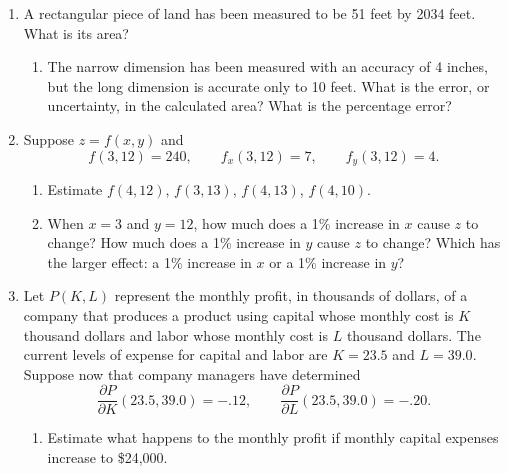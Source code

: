 \begin{enumerate}
\begin{enumerate}
  \item Write the full microscope equation for $G(u, v)$ at $(u, v) = (1,
2)$.

  \item Use the full microscope equation to approximate $G(.8,2.1)$.  How
close is your approximation to the true value of $G(.8,2.1)$?



\end{enumerate}
\item A rectangular piece of land has been measured to be 51 feet by
2034 feet.  What is its area?

  \begin{enumerate}
  \item The narrow dimension has been measured with an accuracy of 4
inches, but the long dimension is accurate only to 10 feet.  What is
the error, or uncertainty, in the calculated area?  What is the
percentage error?


\end{enumerate}
\item Suppose $z = f(x, y)$ and
	\[
f(3, 12) = 240, \qquad f_x(3, 12) = 7, \qquad 
		f_y(3, 12) = 4.
\]


  \begin{enumerate}
  \item Estimate $f(4, 12)$, $f(3, 13)$, $f(4, 13)$,
$f(4, 10)$.

  \item When $x = 3$ and $y = 12$, how much does a 1\% increase in $x$
cause $z$ to change?  How much does a 1\% increase in $y$ cause $z$ to
change?  Which has the larger effect: a 1\% increase in $x$ or a 1\%
increase in $y$?



\end{enumerate}
\item Let $P(K, L)$ represent the monthly profit, in thousands of
dollars, of a company that produces a product using capital whose
monthly cost is $K$ thousand dollars and labor whose monthly cost is
$L$ thousand dollars.  The current levels of expense for capital and
labor are $K = 23.5$ and $L = 39.0$.  Suppose now that company
managers have determined
	\[
\dfrac{\partial P}{\partial K}(23.5, 39.0) = -.12,
	\qquad
	\dfrac{\partial P}{\partial L}(23.5, 39.0) = -.20.
\]


  \begin{enumerate}
  \item Estimate what happens to the monthly profit if monthly capital
expenses increase to \$24,000.


\end{enumerate}
\end{enumerate}
